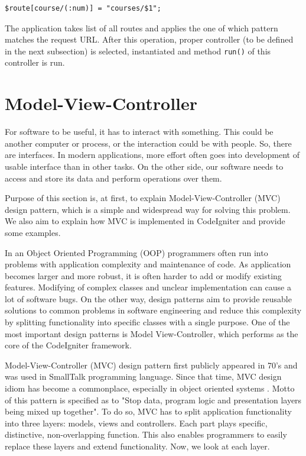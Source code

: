 \begin{lstlisting}[basicstyle=\small,caption={CodeIgniter routing}]
$route[course/(:num)] = "courses/$1";
\end{lstlisting}

The application takes list of all routes and applies the one of which pattern matches the request URL. After this operation, proper controller (to be defined in the next subsection) is selected, instantiated and method \texttt{run()} of this controller is run.

\section{Model-View-Controller}
For software to be useful, it has to interact with something. This could be another computer or process, or the interaction could be with people. So, there are interfaces. In modern applications, more effort often goes into development of usable interface than in other tasks. On the other side, our software needs to access and store its data and perform operations over them.

Purpose of this section is, at first, to explain Model-View-Controller (MVC) design pattern, which is a simple and widespread way for solving this problem. We also aim to explain how MVC is implemented in CodeIgniter and provide some examples.

In an Object Oriented Programming (OOP) programmers often run into problems with application complexity and maintenance of code. As application becomes larger and more robust, it is often harder to add or modify existing features. Modifying of complex classes and unclear implementation can cause a lot of software bugs. On the other way, design patterns aim to provide reusable solutions to common problems in software engineering and reduce this complexity by splitting functionality into specific classes with a single purpose. One of the most important design patterns is Model View-Controller, which performs as the core of the CodeIgniter framework.

Model-View-Controller (MVC) design pattern first publicly appeared in 70’s and was used in SmallTalk programming language. Since that time, MVC design idiom has become a commonplace, especially in object oriented systems \cite{deacon2009model}. Motto of this pattern is specified as to "Stop data, program logic and presentation layers being mixed up together". To do so, MVC has to split application functionality into three layers: models, views and controllers. Each part plays specific, distinctive, non-overlapping function. This also enables programmers to easily replace these layers and extend functionality. Now, we look at each layer.


